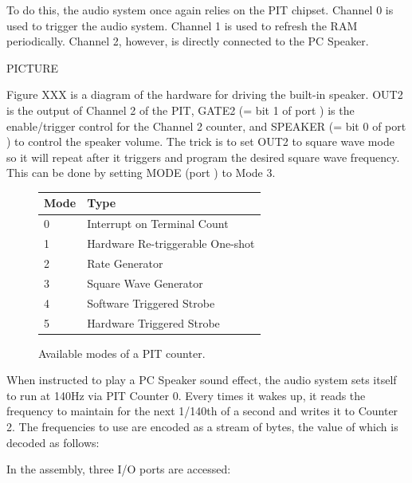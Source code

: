 \documentclass[book.tex]{subfiles}
\begin{document}
To do this, the audio system once again relies on the PIT chipset. Channel 0 is used to trigger the audio system. Channel 1 is used to refresh the RAM periodically. Channel 2, however, is directly connected to the PC Speaker. \\
\par
PICTURE\\
\par

Figure XXX is a diagram of the hardware for driving the built-in speaker. OUT2 is the output of Channel 2 of the PIT, GATE2 (= bit 1 of port ) is the enable/trigger control for the Channel 2 counter, and SPEAKER (= bit 0 of port ) to control the speaker volume. The trick is to set OUT2 to square wave mode so it will repeat after it triggers and program the desired square wave frequency. This can be done by setting MODE (port ) to Mode 3.\\
\par
\begin{figure}[H]
\centering
   \begin{tabularx}{\textwidth}{ X X  }
	  \toprule
	  \textbf{Mode} & \textbf{Type} \\ \bottomrule
	    0 & Interrupt on Terminal Count\\
		1 & Hardware Re-triggerable One-shot\\
		2 & Rate Generator\\
		3 & Square Wave Generator\\
		4 & Software Triggered Strobe\\
		5 & Hardware Triggered Strobe\\
	  \bottomrule
  \end{tabularx}
  \caption{Available modes of a PIT counter.}
\end{figure}
\par 
When instructed to play a PC Speaker sound effect, the audio system sets itself to run at 140Hz via PIT Counter 0. Every times it wakes up, it reads the frequency to maintain for the next 1/140th of a second and writes it to Counter 2. The frequencies to use are encoded as a stream of bytes, the value of which is decoded as follows:\\
\par 
\begin{minipage}{\textwidth}

\end{minipage}
\par
In the assembly, three I/O ports are accessed:\\
\par
\begin{minipage}{\textwidth}

\end{minipage}
\par
\end{document}

